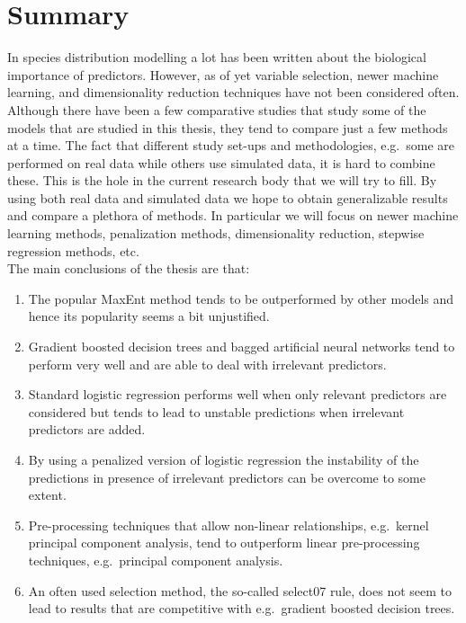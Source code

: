 \chapter{Summary}
\label{ch:Summary}
In species distribution modelling a lot has been written about the biological importance of predictors. However, as of yet variable selection, newer machine learning, and dimensionality reduction techniques have not been considered often. Although there have been a few comparative studies that study some of the models that are studied in this thesis, they tend to compare just a few methods at a time. The fact that different study set-ups and methodologies, e.g.\ some are performed on real data  while others use simulated data, it is hard to combine these. This is the hole in the current research body that we will try to fill. By using both real data and simulated data we hope to obtain generalizable results and compare a plethora of methods. In particular we will focus on newer machine learning methods, penalization methods, dimensionality reduction, stepwise regression methods, etc.\\

The main conclusions of the thesis are that:
\begin{enumerate}
\item The popular MaxEnt method tends to be outperformed by other models and hence its popularity seems a bit unjustified.
\item Gradient boosted decision trees and bagged artificial neural networks tend to perform very well and are able to deal with irrelevant predictors.
\item Standard logistic regression performs well when only relevant predictors are considered but tends to lead to unstable predictions when irrelevant predictors are added.
\item By using a penalized version of logistic regression the instability of the predictions in presence of irrelevant predictors can be overcome to some extent.
\item Pre-processing techniques that allow non-linear relationships, e.g.\ kernel principal component analysis, tend to outperform linear pre-processing techniques, e.g.\ principal component analysis.
\item An often used selection method, the so-called select07 rule, does not seem to lead to results that are competitive with e.g.\ gradient boosted decision trees.
\end{enumerate}